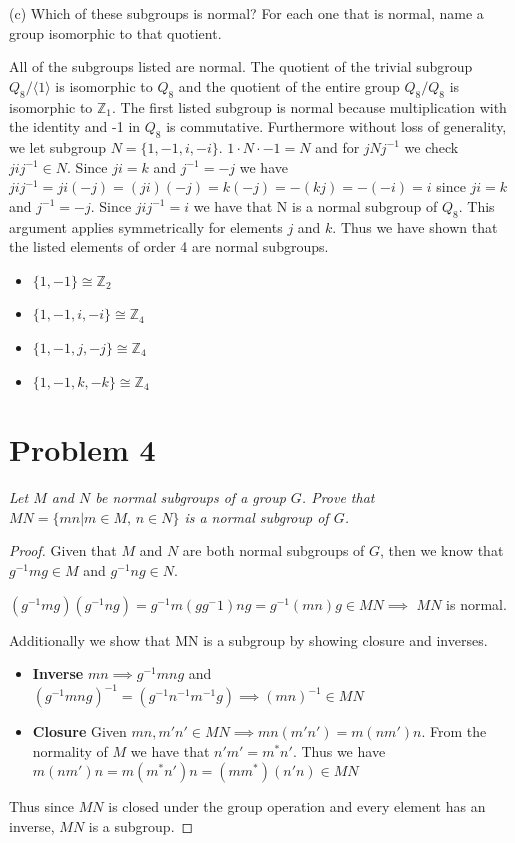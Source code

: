 \documentclass{article}
\theoremstyle{plain} %
\theoremstyle{definition} %
\begin{document}
\noindent(c) Which of these subgroups is normal? For each one that is normal, name a group
isomorphic to that quotient.

All of the subgroups listed are normal. The quotient of the trivial subgroup $Q_8/\langle1\rangle$ is isomorphic to 
$Q_8$ and the quotient of the entire group $Q_8/Q_8$ is isomorphic to $\mathbb{Z}_1$.
The first listed subgroup is normal because multiplication with the identity and -1 in $Q_8$ is commutative.
Furthermore without loss of generality, we let subgroup $N = \{1, -1, i, -i\}$. $1 \cdot N \cdot -1 = N$ and for
$jNj^{-1}$ we check $jij^{-1} \in N$. Since $ji=k$ and $j^{-1} = -j$ we have $jij^{-1} = ji(-j) = (ji)(-j) = k(-j) = -(kj) = -(-i) = i$ since $ji=k$ and $j^{-1} = -j$.
Since $jij^{-1} = i$ we have that N is a normal subgroup of $Q_8$. This argument applies symmetrically for elements $j$ and $k$.
Thus we have shown that the listed elements of order 4 are normal subgroups.

\begin{itemize}
    \item $\{1, -1\} \cong \mathbb{Z}_2$
    \item $\{1, -1, i, -i\} \cong \mathbb{Z}_4$
    \item $\{1, -1, j, -j\} \cong \mathbb{Z}_4$
    \item $\{1, -1, k, -k\} \cong \mathbb{Z}_4$
\end{itemize}


\section*{Problem 4}
\noindent\textit{Let $M$ and $N$ be normal subgroups of a group $G$. Prove that
$MN = \{mn | m \in M \text{, } n \in N \}$ is a normal subgroup of $G$. }

\begin{proof}
    Given that $M$ and $N$ are both normal subgroups of $G$, then we know that
    $g^{-1}mg \in M$ and $g^{-1}ng \in N$.
    
    \begin{centering}
        $(g^{-1}mg)(g^{-1}ng) = g^{-1}m(gg^-1)ng = g^{-1}(mn)g \in MN \implies$ $MN$ is normal.
    \end{centering}
    Additionally we show that MN is a subgroup by showing closure and inverses.
    \begin{itemize}
        \item \textbf{Inverse} $mn \implies g^{-1}mng$ and $(g^{-1}mng)^{-1} = (g^{-1}n^{-1}m^{-1}g) \implies
        (mn)^{-1} \in MN$
        \item \textbf{Closure} Given $mn, m'n' \in MN \implies mn(m'n') = m(nm')n$. From the normality of
        $M$ we have that $n'm' = m^*n'$. Thus we have $m(nm')n = m(m^*n')n = (mm^*)(n'n) \in MN$
    \end{itemize}
    Thus since $MN$ is closed under the group operation and every element has an inverse, $MN$ is a subgroup.
\end{proof}
\end{document}
